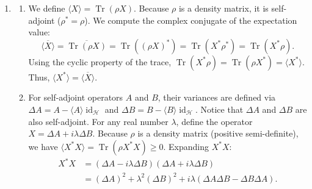 \documentclass{article}
\begin{document}
\begin{enumerate}[label=\fbox{\arabic*}]
\begin{enumerate}[label=(\arabic*)]
                From part (2), we already have $e(A, B) = 0$.
                Now, expressing $m$ using the partition $A, B, C, D$:
                $m = f(A) = e(A, B) + e(A, C) + e(A, D) = e(A, C) + e(A, D)$.
                Also, $m = f(C) = e(C, A) + e(C, B) + e(C, D) = e(C, A) + e(C, B)$.
                And $m = f(A \cup C) = e(A, B) + e(A, D) + e(C, B) + e(C, D) = e(A, D) + e(C, B)$.
                Comparing $f(A)$ and $f(A \cup C)$, we get $e(A, C) + e(A, D) = e(A, D) + e(C, B)$, which implies $e(A, C) = e(B, C)$.
                Substituting this back into $f(C)$, we get $m = e(C, A) + e(C, B) = 2e(C, A)$.
                Therefore, $m$ must be an even number.
        \end{enumerate}

  \item %
        \begin{enumerate}[label=(\arabic*)]
          \item We define $\langle X \rangle = \operatorname{Tr}(\rho X)$. Because $\rho$ is a density matrix, it is self-adjoint ($\rho^* = \rho$).
                We compute the complex conjugate of the expectation value:
                \[
                  \overline{\langle X \rangle} = \overline{\operatorname{Tr}(\rho X)} = \operatorname{Tr}((\rho X)^*) = \operatorname{Tr}(X^* \rho^*) = \operatorname{Tr}(X^* \rho).
                \]
                Using the cyclic property of the trace, $\operatorname{Tr}(X^* \rho) = \operatorname{Tr}(\rho X^*) = \langle X^* \rangle$. Thus, $\langle X^* \rangle = \overline{\langle X \rangle}$.
          \item For self-adjoint operators $A$ and $B$, their variances are defined via $\Delta A = A - \langle A \rangle \operatorname{id}_{\mathcal{H}}$ and $\Delta B = B - \langle B \rangle \operatorname{id}_{\mathcal{H}}$. Notice that $\Delta A$ and $\Delta B$ are also self-adjoint.
                For any real number $\lambda$, define the operator $X = \Delta A + i \lambda \Delta B$.
                Because $\rho$ is a density matrix (positive semi-definite), we have $\langle X^* X \rangle = \operatorname{Tr}(\rho X^* X) \ge 0$.
                Expanding $X^* X$:
                \begin{align*}
                  X^* X & = (\Delta A - i \lambda \Delta B)(\Delta A + i \lambda \Delta B)                             \\
                        & = (\Delta A)^2 + \lambda^2 (\Delta B)^2 + i \lambda (\Delta A \Delta B - \Delta B \Delta A).
                \end{align*}

\end{enumerate}
\end{enumerate}
\end{document}
